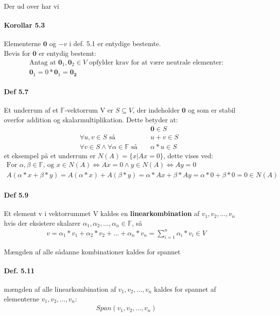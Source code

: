 \documentclass[paper=a4, fontsize=11pt]{scrartcl} %
\begin{document}
	Der ud over har vi
	\paragraph{Korollar 5.3} Elementerne $\mathbf{0}$ og $-v$ i def. 5.1 er entydige bestemte. \\
	Bevis for $\mathbf{0}$ er entydig bestemt:
	\begin{gather*}
		\text{Antag at $\mathbf{0}_1, \mathbf{0}_2\in V$ opfylder krav for at være neutrale elementer:} \\
		\mathbf{0}_1=0*\mathbf{0}_1=\mathbf{0_2}
	\end{gather*}
	
	\paragraph{Def 5.7} Et underrum af et $\mathbb{F}$-vektorrum V er  $S \subseteq V$, der indeholder $\mathbf{0}$ og som er stabil overfor addition og skalarmultiplikation. Dette betyder at:
	\setcounter{equation}{0}
	\begin{align}
		& &&\mathbf{0}\in S  \\
		&\forall u,v \in S \text{ så } &&u+v\in S \\
		&\forall v \in S \land \forall\alpha\in\mathbb{F} \text{ så } &&\alpha*u\in S
	\end{align}
	et eksempel på et underrum er $N(A)=\{x|Ax=0\}$, dette vises ved:
	\begin{gather*}
		\text{For } \alpha, \beta\in\mathbb{F} \text{, og }x\in N(A) \iff Ax=0 \land y\in N(A) \iff Ay=0 \\
		A(\alpha*x+\beta*y)=A(\alpha*x)+A(\beta*y)=\alpha*Ax+\beta*Ay=\alpha*0+\beta*0=0\in N(A)	
	\end{gather*}
	
	\paragraph{Def 5.9} Et element v i vektorrummet V kaldes en \textbf{linearkombination} af $v_1,v_2,...,v_n$ hvis der eksistere skalarer $\alpha_1,\alpha_2,...,\alpha_n\in\mathbb{F}$, så
	\begin{align*}
		v=\alpha_1*v_1+\alpha_2*v_2+...+\alpha_n*v_n=\sum_{i=1}^{n}\alpha_i*v_i \in V
	\end{align*}
	
	Mængden af alle sådanne kombinationer kaldes for spannet
	
	\paragraph{Def. 5.11} mængden af alle linearkombination af $v_1,v_2,...,v_n$ kaldes for spannet af elementerne $v_1,v_2,...,v_n$:
	\begin{align*}
		Span(v_1,v_2,...,v_n)
	\end{align*}
	
\end{document}

